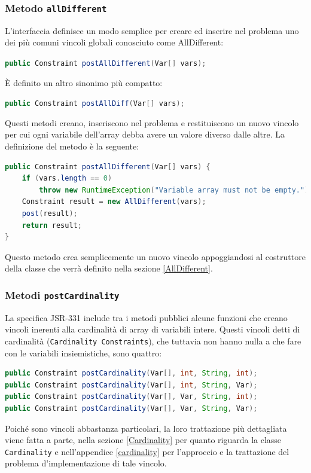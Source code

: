 \subsubsection{Metodo \texttt{allDifferent}}
L'interfaccia  definisce un modo semplice per creare ed inserire
nel problema uno dei più comuni vincoli globali conosciuto come AllDifferent:
\begin{center}
\lstinline[language = Java]$public Constraint postAllDifferent(Var[] vars);$
\end{center}
\`E definito un altro sinonimo più compatto:
\begin{center}
\lstinline[language = Java]$public Constraint postAllDiff(Var[] vars);$
\end{center}
Questi metodi creano, inseriscono nel problema e restituiscono un nuovo vincolo
per cui ogni variabile dell'array  debba avere un valore diverso 
dalle altre.
La definizione del metodo è la seguente:
\begin{lstlisting}[language = Java,
                   caption = {\files{allDifferent}.}]
public Constraint postAllDifferent(Var[] vars) {
	if (vars.length == 0)
		throw new RuntimeException("Variable array must not be empty.");
	Constraint result = new AllDifferent(vars);
	post(result);
	return result;
}
\end{lstlisting}
Questo metodo crea semplicemente un nuovo vincolo appoggiandosi al costruttore 
della classe  che verrà definito nella sezione 
\ref{AllDifferent}.

\subsubsection{Metodi \texttt{postCardinality}}
La specifica JSR-331 include tra i metodi pubblici alcune funzioni che
creano vincoli inerenti alla cardinalità di array di variabili
intere. Questi vincoli detti di cardinalità (\texttt{Cardinality Constraints}), 
che tuttavia non hanno nulla a che fare con le variabili insiemistiche, sono
quattro:
\begin{lstlisting}[language = Java, frame = single]
public Constraint postCardinality(Var[], int, String, int);
public Constraint postCardinality(Var[], int, String, Var);
public Constraint postCardinality(Var[], Var, String, int);
public Constraint postCardinality(Var[], Var, String, Var);
\end{lstlisting}

Poiché sono vincoli abbastanza particolari, la loro trattazione più dettagliata
viene fatta a parte, nella sezione \ref{Cardinality} per quanto riguarda la
classe \texttt{Cardinality} e nell'appendice \ref{cardinality} per l'approccio
e la trattazione del problema d'implementazione di tale vincolo.

